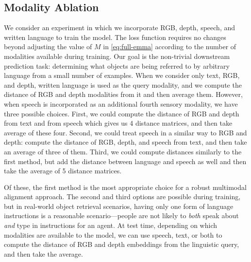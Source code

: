 \documentclass[sigconf,natbib=true,anonymous=true]{acmart}
\newcommand{\todokdinline}[1]{\todo[color=red!20,inline]{{KD: \small #1}}}
\begin{document}
\subsection{Modality Ablation}
\label{sub:ablations}
We consider an experiment in which we incorporate RGB, depth, speech, and written language to train the model. The loss function requires no changes beyond adjusting the value of $M$ in \cref{eq:full-emma} according to the number of modalities available during training. Our goal is the non-trivial downstream prediction task: determining what objects are being referred to by arbitrary language from a small number of examples. When we consider only text, RGB, and depth, written language is used as the query modality, and we compute the distance of RGB and depth modalities from it and then average them. However, when speech is incorporated as an additional fourth sensory modality, we have three possible choices. First, we could compute the distance of RGB and depth from text and from speech which gives us 4 distance matrices, and then take average of these four. Second, we could treat speech in a similar way to RGB and depth: compute the distance of RGB, depth, and speech from text, and then take an average of three of them. Third, we could compute distances similarly to the first method, but add the distance between language and speech as well and then take the average of 5 distance matrices.

Of these, the first method is the most appropriate choice for a robust multimodal alignment approach. The second and third options are possible during training, but in real-world object retrieval scenarios, having only one form of language instructions is a reasonable scenario---people are not likely to \textit{both} speak about \textit{and} type in instructions for an agent. At test time, depending on which modalities are available to the model, we can use speech, text, or both to compute the distance of RGB and depth embeddings from the linguistic query, and then take the average.
\end{document}
